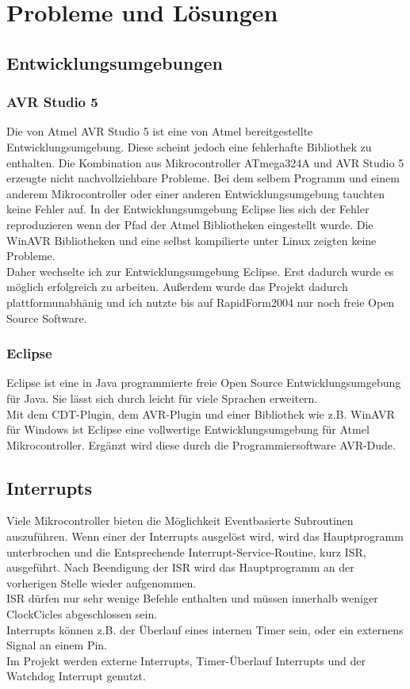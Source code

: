 \chapter{Probleme und Lösungen}
\section{Entwicklungsumgebungen}
\subsection{AVR Studio 5}
Die von Atmel AVR Studio 5 ist eine von Atmel bereitgestellte Entwicklungsumgebung. Diese scheint jedoch eine fehlerhafte Bibliothek zu enthalten. Die Kombination aus Mikrocontroller ATmega324A und AVR Studio 5 erzeugte nicht nachvollziehbare Probleme. Bei dem selbem Programm und einem anderem Mikrocontroller oder einer anderen Entwicklungsumgebung tauchten keine Fehler auf.
In der Entwicklungsumgebung Eclipse lies sich der Fehler reproduzieren wenn der Pfad der Atmel Bibliotheken eingestellt wurde. Die WinAVR Bibliotheken und eine selbst kompilierte  unter Linux zeigten keine Probleme.\\
Daher wechselte ich zur  Entwicklungsumgebung Eclipse. Erst dadurch wurde es möglich erfolgreich zu arbeiten. Außerdem wurde das Projekt dadurch plattformunabhänig und ich nutzte bis auf RapidForm2004 nur noch freie Open Source Software.\\
\subsection{Eclipse}
Eclipse ist eine in Java programmierte freie Open Source Entwicklungsumgebung für Java. Sie lässt sich durch  leicht für viele Sprachen erweitern.\\
Mit dem CDT-Plugin, dem AVR-Plugin und einer Bibliothek wie z.B. WinAVR für Windows ist Eclipse eine vollwertige Entwicklungsumgebung für Atmel Mikrocontroller. 
Ergänzt wird diese durch die Programmiersoftware AVR-Dude.\\

\section{Interrupts}
\label{sec:Interrupts}
Viele Mikrocontroller bieten die Möglichkeit Eventbasierte Subroutinen auszuführen. Wenn einer der Interrupts ausgelöst wird, wird das Hauptprogramm unterbrochen und die Entsprechende Interrupt-Service-Routine, kurz ISR, ausgeführt. Nach Beendigung der ISR wird das Hauptprogramm an der  vorherigen Stelle wieder aufgenommen.\\
ISR dürfen nur sehr wenige Befehle enthalten und müssen innerhalb weniger ClockCicles abgeschlossen sein. \\
Interrupts können z.B. der Überlauf eines internen Timer sein, oder ein externens Signal an einem Pin.\\
Im Projekt werden externe Interrupts, Timer-Überlauf Interrupts und der Watchdog Interrupt genutzt. 
